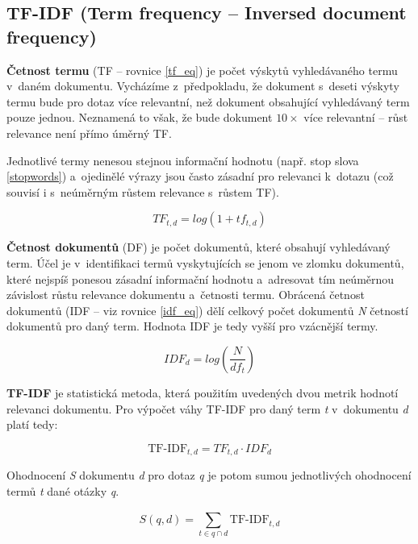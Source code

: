 \subsection{TF-IDF (Term frequency -- Inversed document frequency)}
\label{tf-idf}

\textbf{Četnost termu} (TF -- rovnice \ref{tf_eq}) je počet výskytů vyhledávaného termu v~daném dokumentu. Vycházíme z~předpokladu, že dokument s~deseti výskyty termu bude pro dotaz více relevantní, než dokument obsahující vyhledávaný term pouze jednou. Neznamená to však, že bude dokument $10\times$ více relevantní -- růst relevance není přímo úměrný TF.\par
Jednotlivé termy nenesou stejnou informační hodnotu (např. stop slova \ref{stopwords}) a~ojedinělé výrazy jsou často zásadní pro relevanci k~dotazu (což souvisí i s~neúměrným růstem relevance s~růstem TF).\par

\begin{equation}
\label{tf_eq}
    TF_{t,d} = log(1+tf_{t,d})
\end{equation}

\textbf{Četnost dokumentů} (DF) je počet dokumentů, které obsahují vyhledávaný term. Účel je v~identifikaci termů vyskytujících se jenom ve zlomku dokumentů, které nejspíš ponesou zásadní informační hodnotu a~adresovat tím neúměrnou závislost růstu relevance dokumentu a~četnosti termu. Obrácená četnost dokumentů (IDF -- viz rovnice \ref{idf_eq}) dělí celkový počet dokumentů \emph{N} četností dokumentů pro daný term. Hodnota IDF je tedy vyšší pro vzácnější termy.\par

\begin{equation}
\label{idf_eq}
    IDF_{d} = log(\frac{N}{df_t})
\end{equation}

\textbf{TF-IDF} je statistická metoda, která použitím uvedených dvou metrik hodnotí relevanci dokumentu.
Pro výpočet váhy TF-IDF pro daný term \emph{t} v~dokumentu \emph{d} platí tedy:

\begin{equation}
    \text{TF-IDF}_{t,d} = TF_{t,d} \cdot IDF_d
\end{equation}

Ohodnocení \emph{S} dokumentu \emph{d} pro dotaz \emph{q} je potom sumou jednotlivých ohodnocení termů \emph{t} dané otázky \emph{q}.

\begin{equation}
    S(q,d) = \sum_{t\in{q \cap d}}^{}\text{TF-IDF}_{t,d}
\end{equation}

